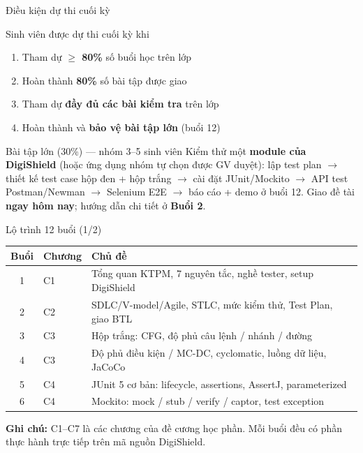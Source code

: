 \documentclass[aspectratio=169,12pt]{beamer}
\begin{document}
\begin{frame}{Điều kiện dự thi cuối kỳ}
  \begin{block}{Sinh viên được dự thi cuối kỳ khi}
    \begin{enumerate}
      \item Tham dự \textbf{$\geq$ 80\%} số buổi học trên lớp
      \item Hoàn thành \textbf{80\%} số bài tập được giao
      \item Tham dự \textbf{đầy đủ các bài kiểm tra} trên lớp
      \item Hoàn thành và \textbf{bảo vệ bài tập lớn} (buổi 12)
    \end{enumerate}
  \end{block}

  \vspace{0.4em}
  \begin{exampleblock}{Bài tập lớn (30\%) --- nhóm 3--5 sinh viên}
    Kiểm thử một \textbf{module của DigiShield} (hoặc ứng dụng nhóm tự chọn được GV duyệt):
    lập test plan $\to$ thiết kế test case hộp đen + hộp trắng $\to$ cài đặt
    JUnit/Mockito $\to$ API test Postman/Newman $\to$ Selenium E2E $\to$
    báo cáo + demo ở buổi 12. Giao đề tài \textbf{ngay hôm nay};
    hướng dẫn chi tiết ở \textbf{Buổi 2}.
  \end{exampleblock}
\end{frame}

\begin{frame}{Lộ trình 12 buổi (1/2)}
  \begin{center}
  \footnotesize
  \begin{tabular}{cl>{\raggedright\arraybackslash}p{8.6cm}}
    \toprule
    \textbf{Buổi} & \textbf{Chương} & \textbf{Chủ đề} \\
    \midrule
    1 & C1 & Tổng quan KTPM, 7 nguyên tắc, nghề tester, setup DigiShield \\
    2 & C2 & SDLC/V-model/Agile, STLC, mức kiểm thử, Test Plan, giao BTL \\
    3 & C3 & Hộp trắng: CFG, độ phủ câu lệnh / nhánh / đường \\
    4 & C3 & Độ phủ điều kiện / MC-DC, cyclomatic, luồng dữ liệu, JaCoCo \\
    5 & C4 & JUnit 5 cơ bản: lifecycle, assertions, AssertJ, parameterized \\
    6 & C4 & Mockito: mock / stub / verify / captor, test exception \\
    \bottomrule
  \end{tabular}
  \end{center}

  \vspace{0.2em}
  {\small \textbf{Ghi chú:} C1--C7 là các chương của đề cương học phần.
  Mỗi buổi đều có phần thực hành trực tiếp trên mã nguồn DigiShield.}
\end{frame}
\end{document}
